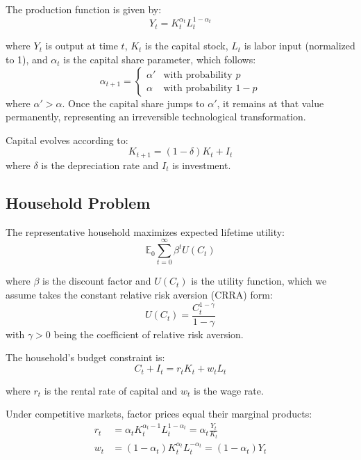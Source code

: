 \documentclass{article}
\theoremstyle{plain}    %
\theoremstyle{definition}  %
\begin{document}
The production function is given by:
\begin{equation}
Y_t = K_t^{\alpha_t} L_t^{1-\alpha_t}
\end{equation}

where $Y_t$ is output at time $t$, $K_t$ is the capital stock, $L_t$ is labor input (normalized to 1), and $\alpha_t$ is the capital share parameter, which follows:
\begin{equation}
\alpha_{t+1} = 
\begin{cases}
\alpha' & \text{with probability } p \\
\alpha & \text{with probability } 1-p
\end{cases}
\end{equation}
where $\alpha' > \alpha$. Once the capital share jumps to $\alpha'$, it remains at that value permanently, representing an irreversible technological transformation.

Capital evolves according to:
\begin{equation}
K_{t+1} = (1-\delta)K_t + I_t
\end{equation}
where $\delta$ is the depreciation rate and $I_t$ is investment.

\subsection{Household Problem}

The representative household maximizes expected lifetime utility:
\begin{equation}
\mathbb{E}_0 \sum_{t=0}^{\infty} \beta^t U(C_t)
\end{equation}

where $\beta$ is the discount factor and $U(C_t)$ is the utility function, which we assume takes the constant relative risk aversion (CRRA) form:
\begin{equation}
U(C_t) = \frac{C_t^{1-\gamma}}{1-\gamma}
\end{equation}
with $\gamma > 0$ being the coefficient of relative risk aversion.

The household's budget constraint is:
\begin{equation}
C_t + I_t = r_t K_t + w_t L_t
\end{equation}

where $r_t$ is the rental rate of capital and $w_t$ is the wage rate.

Under competitive markets, factor prices equal their marginal products:
\begin{align}
r_t &= \alpha_t K_t^{\alpha_t-1} L_t^{1-\alpha_t} = \alpha_t \frac{Y_t}{K_t} \\
w_t &= (1-\alpha_t) K_t^{\alpha_t} L_t^{-\alpha_t} = (1-\alpha_t) Y_t
\end{align}
\end{document}
